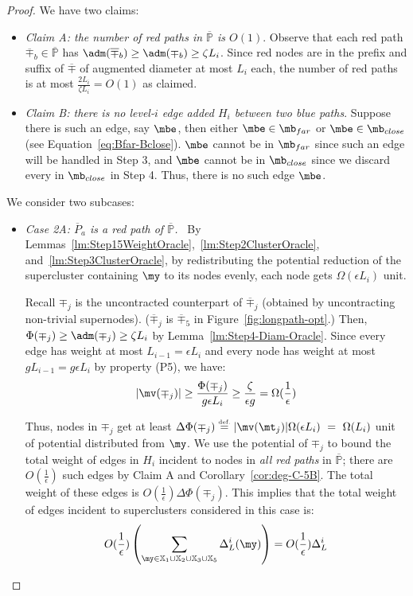 \begin{proof}
We have two claims:
\begin{itemize}
	\item \textit{Claim A: the number of red paths in $\overline{\mathbb{P}}$ is $O(1)$}.   Observe that each red path $\overline{\mp}_b \in \overline{\mathbb{P}}$ has $\adm(\overline{\mp}_b)\geq \adm(\mp_b) \geq \zeta L_i$. Since red nodes are in the prefix and suffix of $\overline{\mp}$ of augmented diameter at most $L_i$ each, the number of red paths is at most $\frac{2L_i}{\zeta L_i} = O(1)$ as claimed.
	\item \textit{Claim B: there is no level-$i$ edge added $H_i$  between two blue paths}. Suppose there is such an edge, say $\mbe$, then either $\mbe \in \mb_{far}$ or $\mbe \in \mb_{close}$ (see Equation~\eqref{eq:Bfar-Bclose}). $\mbe$ cannot be in $\mb_{far}$ since such an edge will be handled in Step 3, and $\mbe$ cannot be in $\mb_{close}$ since we discard every in $\mb_{close}$ in Step 4. Thus, there is no such edge $\mbe$. 
\end{itemize}

 We consider two subcases:

\begin{itemize}
	\item 	 \emph{Case 2A: $\overline{P}_a$ is a red path of $\overline{\mathbb{P}}$.~}  By Lemmas~\ref{lm:Step15WeightOracle},~\ref{lm:Step2ClusterOracle}, and~\ref{lm:Step3ClusterOracle}, by redistributing the potential reduction of the supercluster containing $\my$ to its nodes evenly, each node gets $\Omega(\epsilon L_i)$ unit.  
	
	Recall $\mp_j$ is the uncontracted counterpart of $\overline{\mp}_j$ (obtained by uncontracting non-trivial supernodes). ($\overline{\mp}_j$ is $\overline{\mp}_5$ in Figure~\ref{fig:longpath-opt}.) Then, $\Phi(\mp_j)\geq \adm(\mp_j) \geq \zeta L_i$ by Lemma~\ref{lm:Step4-Diam-Oracle}. Since every edge has weight at most $L_{i-1} =\epsilon L_i$ and every node has weight at most $gL_{i-1} = g\epsilon L_i$ by property (P5), we have:
	\begin{equation*}
	|\mv(\mp_j)| \geq \frac{\Phi(\mp_j)}{g\epsilon L_i} \geq \frac{\zeta}{\epsilon g} = \Omega(\frac{1}{\epsilon})
	\end{equation*}
	
	Thus, nodes in $\mp_j$ get at least $\Delta\Phi(\mp_j) \stackrel{\mbox{\tiny{def.}}}{=} |\mv(\mt_j)|\Omega(\epsilon L_i) ~=~ \Omega(L_i)$ unit of potential distributed from $\my$.	We use the potential of $\mp_j$ to bound the total weight of edges in $H_i$ incident to nodes in \emph{all red paths} in $\overline{\mathbb{P}}$; there are $O(\frac{1}{\epsilon})$ such edges by Claim A and Corollary~\ref{cor:deg-C-5B}. The total weight of these edges is $O(\frac{1}{\epsilon})\Delta\Phi(\mp_j)$. This implies that the total weight of edges incident to superclusters considered in this case is:
	\begin{equation}\label{eq:H5B3}
	O(\frac{1}{\epsilon})\left(\sum_{\my \in \mathbb{X}_1 \cup \mathbb{X}_2 \cup \mathbb{X}_3\cup \mathbb{X}_5}\Delta^i_{L}(\my)\right) = O(\frac{1}{\epsilon})\Delta^i_{L}
	\end{equation}
	

\end{itemize}
\end{proof}

